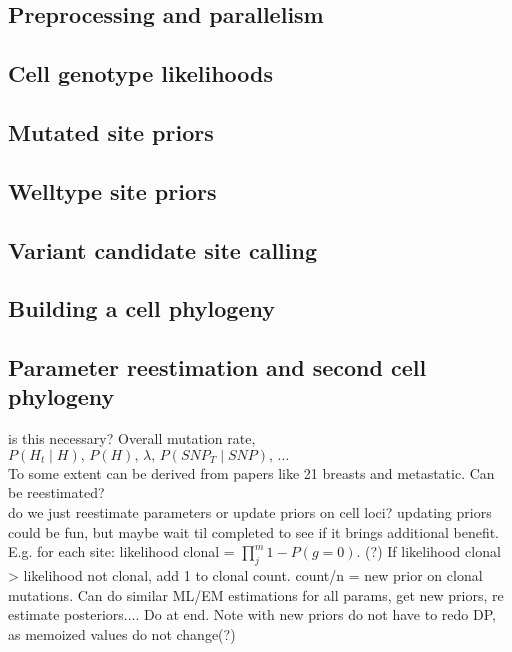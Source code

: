 \documentclass[../main.tex]{subfiles}
\begin{document}


\subsection{Preprocessing and parallelism}


\subsection{Cell genotype likelihoods}


\subsection{Mutated site priors}


\subsection{Welltype site priors}


\subsection{Variant candidate site calling}


\subsection{Building a cell phylogeny}



\subsection{Parameter reestimation and second cell phylogeny}
is this necessary? Overall mutation rate, $P(H_t\mid H),\,P(H),\,\lambda,\,P(SNP_T\mid SNP),\,\dots$\\
To some extent can be derived from papers like 21 breasts and metastatic. Can be reestimated?\\
do we just reestimate parameters or update priors on cell loci? updating priors could be fun, but maybe wait til completed to see if it brings additional benefit.\\
E.g. for each site: likelihood clonal = $\prod_j^m 1-P(g=0)$. (?) If likelihood clonal > likelihood not clonal, add 1 to clonal count. count/n = new prior on clonal mutations. Can do similar ML/EM estimations for all params, get new priors, re estimate posteriors.... Do at end. Note with new priors do not have to redo DP, as memoized values do not change(?)
\end{document}
